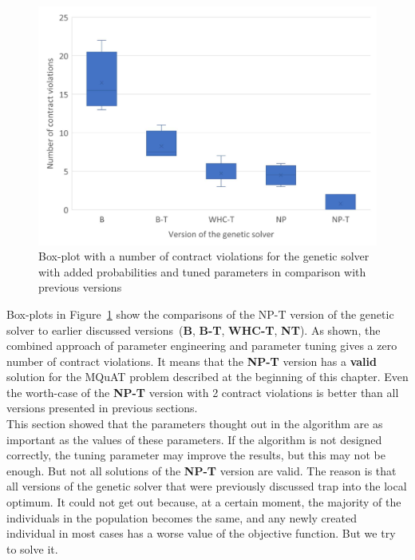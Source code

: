 \begin{figure}
	\centering
	\includegraphics[width=\textwidth]{images/BoxPlotSolverNewParametersTuning.pdf}
	\caption[Box-plot with a number of contract violations for the genetic solver with added probabilities and tuned parameters in comparison with previous versions]{Box-plot with a number of contract violations for the genetic solver with added probabilities and tuned parameters in comparison with previous versions}
	\label{fig:boxplotsolverNewParametersTuning}
\end{figure}

Box-plots in Figure~\ref{fig:boxplotsolverNewParametersTuning} show the comparisons of the NP-T version of the genetic solver to earlier discussed versions~(\textbf{B}, \textbf{B-T}, \textbf{WHC-T}, \textbf{NT}). As shown, the combined approach of parameter engineering and parameter tuning gives a zero number of contract violations. It means that the \textbf{NP-T} version has a \textbf{valid} solution for the MQuAT problem described at the beginning of this chapter. Even the worth-case of the \textbf{NP-T} version with 2 contract violations is better than all versions presented in previous sections. \\ 

This section showed that the parameters thought out in the algorithm are as important as the values of these parameters. If the algorithm is not designed correctly, the tuning parameter may improve the results, but this may not be enough. But not all solutions of the \textbf{NP-T} version are valid. The reason is that all versions of the genetic solver that were previously discussed trap into the local optimum.  It could not get out because, at a certain moment, the majority of the individuals in the population becomes the same, and any newly created individual in most cases has a worse value of the objective function. But we try to solve it.

